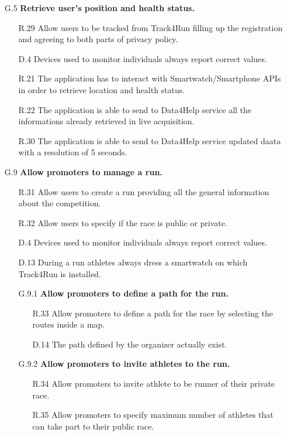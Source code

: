 \begin{enumerate}
	\begin{enumerate}
	\item [G.5] \textbf{Retrieve user's position and health status.}
		\begin{enumerate}
		\item [R.29] Allow users to be tracked from Track4Run filling up the registration and agreeing to both parts of privacy policy.
		\item [D.4] Devices used to monitor individuals always report correct values.
		\item [R.21] The application has to interact with Smartwatch/Smartphone APIs in order to retrieve location and health status.
		\item [R.22] The application is able to send to Data4Help service all the informations already retrieved in live acquisition.
		\item [R.30] The application is able to send to Data4Help service updated daata with a resolution of 5 seconds.
		\end{enumerate}
		
	\item [G.9] \textbf{Allow promoters to manage a run.}
		\begin{enumerate}
		\item [R.31] Allow users to create a run providing all the general information about the competition.
		\item [R.32] Allow users to specify if the race is public or private.
		\item [D.4] Devices used to monitor individuals always report correct values.
		\item [D.13] During a run athletes always dress a smartwatch on which Track4Run is installed.
			
		\item [G.9.1] \textbf{Allow promoters to define a path for the run.}
			\begin{enumerate}
			\item [R.33] Allow promoters to define a path for the race by selecting the routes inside a map.
			\item [D.14] The path defined by the organizer actually exist.
			\end{enumerate}
			
		\item [G.9.2] \textbf{Allow promoters to invite athletes to the run.}
			\begin{enumerate}
			\item [R.34] Allow promoters to invite athlete to be runner of their private race.
			\item [R.35] Allow promoters to specify maximum number of athletes that can take part to their public race.
			\end{enumerate}
	\end{enumerate}
	

\end{enumerate}
\end{enumerate}
